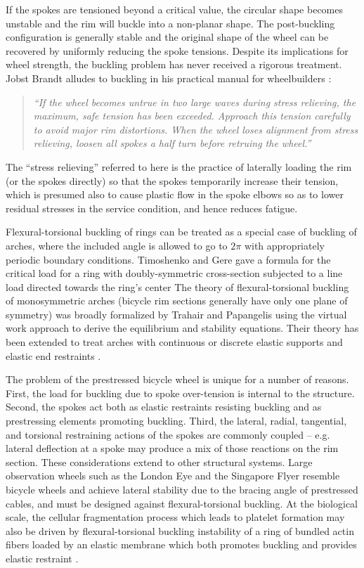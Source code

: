 \documentclass[\rootdir/thesis.tex]{subfiles}
\begin{document}
If the spokes are tensioned beyond a critical value, the circular shape becomes unstable and the rim will buckle into a non-planar shape. The post-buckling configuration is generally stable and the original shape of the wheel can be recovered by uniformly reducing the spoke tensions. Despite its implications for wheel strength, the buckling problem has never received a rigorous treatment. Jobst Brandt alludes to buckling in his practical manual for wheelbuilders \cite{Brandt1993}:

\begin{quote}
\emph{``If the wheel becomes untrue in two large waves during stress relieving, the maximum, safe tension has been exceeded. Approach this tension carefully to avoid major rim distortions. When the wheel loses alignment from stress relieving, loosen all spokes a half turn before retruing the wheel.''}
\end{quote}

The ``stress relieving'' referred to here is the practice of laterally loading the rim (or the spokes directly) so that the spokes temporarily increase their tension, which is presumed also to cause plastic flow in the spoke elbows so as to lower residual stresses in the service condition, and hence reduces fatigue.

Flexural-torsional buckling of rings can be treated as a special case of buckling of arches, where the included angle is allowed to go to $2\pi$ with appropriately periodic boundary conditions. Timoshenko and Gere \cite{Timoshenko1961} gave a formula for the critical load for a ring with doubly-symmetric cross-section subjected to a line load directed towards the ring's center The theory of flexural-torsional buckling of monosymmetric arches (bicycle rim sections generally have only one plane of symmetry) was broadly formalized by Trahair and Papangelis \cite{Trahair1987} using the virtual work approach to derive the equilibrium and stability equations. Their theory has been extended to treat arches with continuous \cite{Pi2002} or discrete \cite{Bradford2002} elastic supports and elastic end restraints \cite{Guo2014}.

The problem of the prestressed bicycle wheel is unique for a number of reasons. First, the load for buckling due to spoke over-tension is internal to the structure. Second, the spokes act both as elastic restraints resisting buckling and as prestressing elements promoting buckling. Third, the lateral, radial, tangential, and torsional restraining actions of the spokes are commonly coupled – e.g. lateral deflection at a spoke may produce a mix of those reactions on the rim section. These considerations extend to other structural systems. Large observation wheels such as the London Eye \cite{Mann2001} and the Singapore Flyer \cite{Allsop2009} resemble bicycle wheels and achieve lateral stability due to the bracing angle of prestressed cables, and must be designed against flexural-torsional buckling. At the biological scale, the cellular fragmentation process which leads to platelet formation may also be driven by flexural-torsional buckling instability of a ring of bundled actin fibers loaded by an elastic membrane which both promotes buckling and provides elastic restraint \cite{Stroberg2016}.
\end{document}
